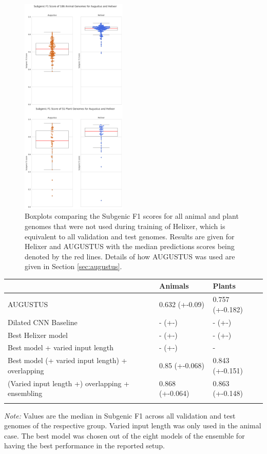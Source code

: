 \documentclass{bioinfo}
\begin{document}
\begin{figure}[!tpb]
	\centerline{\includegraphics[width=0.45\textwidth]{images/overall_boxplot}}
	\caption{Boxplots comparing the Subgenic F1 scores for all animal and plant genomes that were not used during training of Helixer, which is equivalent to all validation and test genomes. Results are given for Helixer and AUGUSTUS with the median predictions scores being denoted by the red lines. Details of how AUGUSTUS was used are given in Section \ref{sec:augustus}.}\label{fig:boxplot}
\end{figure}

\begin{table}[!t]
 {
\begin{tabular}{@{}lll@{}}
\toprule & Animals & Plants\\
\midrule
AUGUSTUS & 0.632 (+-0.09) & 0.757 (+-0.182)\\
Dilated CNN Baseline & - (+-) & - (+-)\\
Best Helixer model & - (+-) & - (+-) \\
Best model + varied input length & - (+-) & - \\
Best model (+ varied input length) + overlapping &  0.85 (+-0.068) & 0.843 (+-0.151) \\
(Varied input length +) overlapping + ensembling & 0.868 (+-0.064) & 0.863 (+-0.148) \\
\botrule
\end{tabular}}{{\it Note:} Values are the median in Subgenic F1 across all validation and test genomes of the respective group. Varied input length was only used in the animal case. The best model was chosen out of the eight models of the ensemble for having the best performance in the reported setup.}
\end{table}
\end{document}
